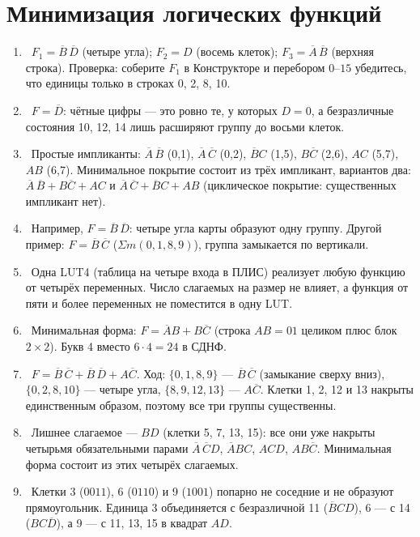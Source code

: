 \section*{Минимизация логических функций}
\begin{enumerate}
  \item {}~$F_1=\overline{B}\,\overline{D}$ (четыре угла); $F_2=D$ (восемь клеток); $F_3=\overline{A}\,\overline{B}$ (верхняя строка). Проверка: соберите $F_1$ в Конструкторе и перебором $0$--$15$ убедитесь, что единицы только в строках 0, 2, 8, 10.
  \item {}~$F=\overline{D}$: чётные цифры --- это ровно те, у которых $D=0$, а безразличные состояния 10, 12, 14 лишь расширяют группу до восьми клеток.
  \item {}~Простые импликанты: $\overline{A}\,\overline{B}$ (0,1), $\overline{A}\,\overline{C}$ (0,2), $\overline{B}C$ (1,5), $B\overline{C}$ (2,6), $AC$ (5,7), $AB$ (6,7). Минимальное покрытие состоит из трёх импликант, вариантов два: $\overline{A}\,\overline{B}+B\overline{C}+AC$ и $\overline{A}\,\overline{C}+\overline{B}C+AB$ (циклическое покрытие: существенных импликант нет).
  \item {}~Например, $F=\overline{B}\,\overline{D}$: четыре угла карты образуют одну группу. Другой пример: $F=\overline{B}\,\overline{C}$ ($\Sigma m(0,1,8,9)$), группа замыкается по вертикали.
  \item {}~Одна LUT4 (таблица на четыре входа в ПЛИС) реализует любую функцию от четырёх переменных. Число слагаемых на размер не влияет, а функция от пяти и более переменных не поместится в одну LUT.
  \item {}~Минимальная форма: $F=\overline{A}B+B\overline{C}$ (строка $AB=01$ целиком плюс блок $2\times2$). Букв 4 вместо $6\cdot4=24$ в СДНФ.
  \item {}~$F=\overline{B}\,\overline{C}+\overline{B}\,\overline{D}+A\overline{C}$. Ход: $\{0,1,8,9\}$ --- $\overline{B}\,\overline{C}$ (замыкание сверху вниз), $\{0,2,8,10\}$ --- четыре угла, $\{8,9,12,13\}$ --- $A\overline{C}$. Клетки 1, 2, 12 и 13 накрыты единственным образом, поэтому все три группы существенны.
  \item {}~Лишнее слагаемое --- $BD$ (клетки 5, 7, 13, 15): все они уже накрыты четырьмя обязательными парами $\overline{A}\,\overline{C}D$, $\overline{A}BC$, $ACD$, $AB\overline{C}$. Минимальная форма состоит из этих четырёх слагаемых.
  \item {}~Клетки 3 ($0011$), 6 ($0110$) и 9 ($1001$) попарно не соседние и не образуют прямоугольник. Единица 3 объединяется с безразличной 11 ($\overline{B}CD$), 6 --- с 14 ($BC\overline{D}$), а 9 --- с 11, 13, 15 в квадрат $AD$.

\end{enumerate}
